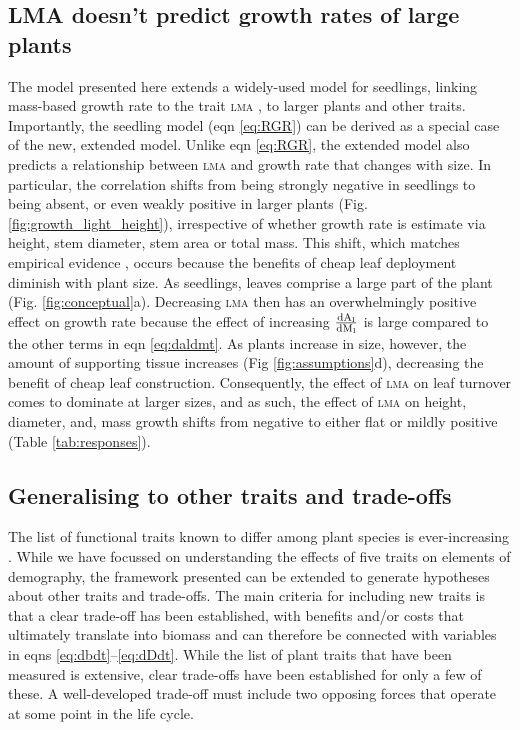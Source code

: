 \documentclass[9pt,twocolumn,twoside,lineno]{pnas-new}
\newcommand{\ud}{\ensuremath{\rm{d}}}
\newcommand{\lma}{\textsc{lma}}
\begin{document}
\subsection{LMA doesn't predict growth rates of large plants}

The model presented here extends a widely-used model for seedlings, linking mass-based growth rate to the trait {\lma} \citep{Lambers-1992, Wright-2000}, to larger plants and other traits. Importantly, the seedling model (eqn \ref{eq:RGR}) can be derived as a special case of the new, extended model. Unlike eqn \ref{eq:RGR}, the extended model also predicts a relationship between {\lma} and growth rate that changes with size. In particular, the correlation shifts from being strongly negative in seedlings to being absent, or even weakly positive in larger plants (Fig. \ref{fig:growth_light_height}), irrespective of whether growth rate is estimate via height, stem diameter, stem area or total mass. This shift, which matches empirical evidence \citep{Poorter-2008, Wright-2010, Herault-2011, Paine-2015, Gibert-2016}, occurs because the benefits of cheap leaf deployment diminish with plant size. As seedlings, leaves comprise a large part of the plant (Fig. \ref{fig:conceptual}a). Decreasing {\lma} then has an overwhelmingly positive effect on growth rate because the effect of increasing $\frac{\ud A_{\rm l}}{\ud M_{\rm l}}$ is large compared to the other terms in eqn \ref{eq:daldmt}. As plants increase in size, however, the amount of supporting tissue increases (Fig \ref{fig:assumptions}d), decreasing the benefit of cheap leaf construction. Consequently, the effect of {\lma} on leaf turnover comes to dominate at larger sizes, and as such, the effect of {\lma} on height, diameter, and, mass growth shifts from negative to either flat or mildly positive  (Table \ref{tab:responses}).


\subsection{Generalising to other traits and trade-offs}

The list of functional traits known to differ among plant species is ever-increasing \citep{Perez-2013}. While we have focussed on understanding the effects of five traits on elements of demography, the framework presented can be extended to generate hypotheses about other traits and trade-offs. The main criteria for including new traits is that a clear trade-off has been established, with benefits and/or costs that ultimately translate into biomass and can therefore be connected with variables in eqns \ref{eq:dbdt}--\ref{eq:dDdt}. While the list of plant traits that have been measured is extensive, clear trade-offs have been established for only a few of these. A well-developed trade-off must include two opposing forces that operate at some point in the life cycle.
\end{document}
